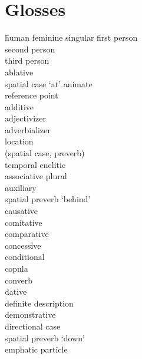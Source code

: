 
\section*{Glosses}
	\begin{multicols}{2}
    \largerpage[2]
		\begin{tabbing}
            \hspace{\tabcolsep}\= human feminine singular\kill
				\>	first person\\
				\>	second person\\
				\>	third person\\
				\>	ablative\\
			 \>	spatial case `at' animate \\
			{}		\> reference point\\
				\>	additive\\
				\>	adjectivizer\\
				\>	adverbializer\\
				\>	location \\
			{}		\>	(spatial case, preverb)\\
				\>	temporal enclitic\\
				\>	associative plural\\
				\>	auxiliary\\
				\>	spatial preverb `behind'\\
				\>	causative\\
				\>	comitative\\
				\>	comparative\\
				\>	concessive\\
				\>	conditional\\
				\>	copula\\
				\>	converb\\
				\>	dative\\
				\>	definite description\\
				\>	demonstrative\\
				\>	directional case\\
				\>	spatial preverb `down'\\
				\>	emphatic particle\\

\end{tabbing}
\end{multicols}
